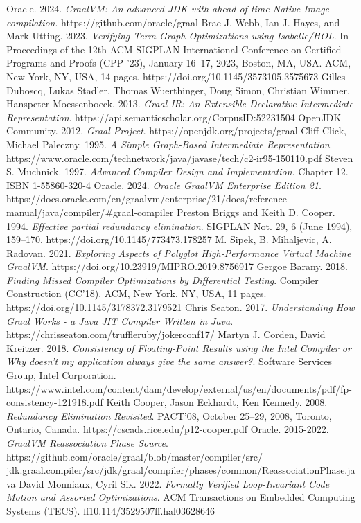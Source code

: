 \documentclass[12pt,openany,a4paper]{book}
\begin{document}
\begin{thebibliography}{99}
 Oracle. 2024. \emph{GraalVM: An advanced JDK with ahead-of-time Native Image compilation}. https://github.com/oracle/graal
 Brae J. Webb, Ian J. Hayes, and Mark Utting. 2023. \emph{Verifying Term Graph Optimizations using Isabelle/HOL}. In Proceedings of the 12th ACM SIGPLAN International Conference on Certified Programs and Proofs (CPP ’23), January 16–17, 2023, Boston, MA, USA. ACM, New York, NY, USA, 14 pages. https://doi.org/10.1145/3573105.3575673
 Gilles Duboscq, Lukas Stadler, Thomas Wuerthinger, Doug Simon, Christian Wimmer, Hanspeter Moessenboeck. 2013. \emph{Graal IR: An Extensible Declarative Intermediate Representation}. https://api.semanticscholar.org/CorpusID:52231504
 OpenJDK Community. 2012. \emph{Graal Project}. https://openjdk.org/projects/graal
 Cliff Click, Michael Paleczny. 1995. \emph{A Simple Graph-Based Intermediate Representation}. https://www.oracle.com/technetwork/java/javase/tech/c2-ir95-150110.pdf
 Steven S. Muchnick. 1997. \emph{Advanced Compiler Design and Implementation}. Chapter 12. ISBN 1-55860-320-4
 Oracle. 2024. \emph{Oracle GraalVM Enterprise Edition 21}. https://docs.oracle.com/en/graalvm/enterprise/21/docs/reference-manual/java/compiler/\#graal-compiler
 Preston Briggs and Keith D. Cooper. 1994. \emph{Effective partial redundancy elimination}. SIGPLAN Not. 29, 6 (June 1994), 159–170. https://doi.org/10.1145/773473.178257
 M. Sipek, B. Mihaljevic, A. Radovan. 2021. \emph{Exploring Aspects of Polyglot High-Performance Virtual Machine GraalVM}. https://doi.org/10.23919/MIPRO.2019.8756917
 Gergoe Barany. 2018. \emph{Finding Missed Compiler Optimizations by Differential Testing}. Compiler Construction (CC’18). ACM, New York, NY, USA, 11 pages. https://doi.org/10.1145/3178372.3179521
 Chris Seaton. 2017. \emph{Understanding How Graal Works - a Java JIT Compiler Written in Java}. https://chrisseaton.com/truffleruby/jokerconf17/
 Martyn J. Corden, David Kreitzer. 2018. \emph{Consistency of Floating-Point Results using the Intel Compiler or Why doesn't my application always give the same answer?}. Software Services Group, Intel Corporation. https://www.intel.com/content/dam/develop/external/us/en/documents/pdf/fp-consistency-121918.pdf
 Keith Cooper, Jason Eckhardt, Ken Kennedy. 2008. \emph{Redundancy Elimination Revisited}. PACT’08, October 25–29, 2008, Toronto, Ontario, Canada. https://cscads.rice.edu/p12-cooper.pdf
 Oracle. 2015-2022. \emph{GraalVM Reassociation Phase Source}. https://github.com/oracle/graal/blob/master/compiler/src/\\jdk.graal.compiler/src/jdk/graal/compiler/phases/common/ReassociationPhase.java
 David Monniaux, Cyril Six. 2022. \emph{Formally Verified Loop-Invariant Code Motion and Assorted Optimizations}. ACM Transactions on Embedded Computing Systems (TECS). ff10.114/3529507ff.hal03628646
\end{thebibliography}
\end{document}
